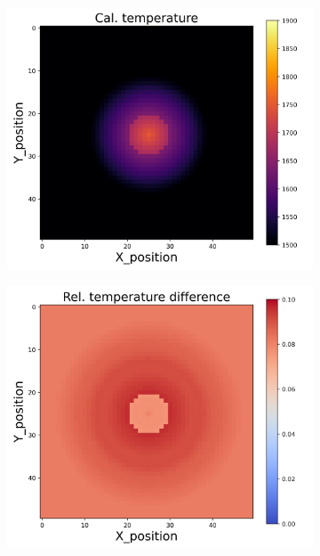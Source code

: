 \begin{figure}[htbp]
    \begin{minipage}{\textwidth}
        \centering
        \begin{subfigure}{0.325\textwidth}
            \centering
            \includegraphics[width=\textwidth]{figures/raw_data/5/linear/T_cal.jpg}
        \end{subfigure}
        \begin{subfigure}{0.325\textwidth}
            \centering
            \includegraphics[width=\textwidth]{figures/raw_data/5/linear/T_bias.jpg}

\end{subfigure}
\end{minipage}
\end{figure}
